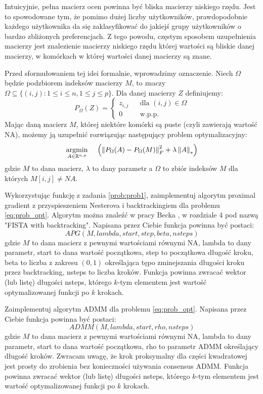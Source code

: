 \documentclass[10pt,a4paper,draft]{report}
\begin{document}
Intuicyjnie, pełna macierz ocen powinna być bliska macierzy niskiego rzędu. Jest to spowodowane tym, że pomimo dużej liczby użytkowników, prawdopodobnie każdego użytkownika da się zaklasyfikować do jakiejś grupy użytkowników o bardzo zbliżonych preferencjach. Z tego powodu, częstym sposobem uzupełnienia macierzy jest znalezienie macierzy niskiego rzędu której wartości są bliskie danej macierzy, w komórkach w której wartości danej macierzy są znane. 

Przed sformułowaniem tej idei formalnie, wprowadzimy oznaczenie. Niech $\Omega$ będzie podzbiorem indeksów macierzy $M$, to znaczy $\Omega \subseteq \{ (i,j): 1 \leq i \leq n, 1 \leq j \leq p\}$. Dla danej macierzy $Z$ definiujemy:
\[
P_{\Omega}(Z) = \left\{
\begin{array}{lcc}
z_{i,j} & & \text{dla } (i,j) \in \Omega \\
0 & & \text{w.p.p.}
\end{array}
\right.
\]
Mając daną macierz $M$, której niektóre komórki są puste (czyli zawierają wartość NA), możemy ją uzupełnić rozwiązując następujący problem optymalizacyjny:
\begin{equation} \label{eq:prob_opt}
\argminl\limits_{A \in \rset^{n,p}} \hspace{12pt} \left( \norm{P_{\Omega}(A) - P_{\Omega}(M)}_F^2 + \lambda \normNuc{A} \right) 
\end{equation}
gdzie $M$ to dana macierz, $\lambda$ to dany parametr a $\Omega$ to zbiór indeksów $M$ dla których $M[i,j] \neq NA$.


\begin{problem}
Wykorzystując funkcję z zadania \ref{prob:prob1}, zaimplementuj algorytm proximal gradient z przyspieszeniem Nesterova i backtrackingiem dla problemu \ref{eq:prob_opt}. Algorytm można znaleźć w pracy Becka \cite{beck} , w rozdziale 4 pod nazwą "FISTA with backtracking". Napisana przez Ciebie funkcja powinna być postaci:
\[
APG(M, lambda, start, step, beta, nsteps) 
\]
\noindent gdzie $M$ to dana macierz z pewnymi wartościami równymi NA, lambda to dany parametr, start to dana wartość początkowa, step to początkowa długość kroku, beta to liczba z zakresu $(0,1)$ określająca tępo zminejszania długości kroku przez backtracking, nsteps to liczba kroków. Funkcja powinna zwracać wektor (lub listę) długości nsteps, którego $k$-tym elementem jest wartość optymalizowanej funkcji po $k$ krokach.

\end{problem}
\newpage
\begin{problem}
Zaimplementuj algorytm ADMM dla problemu \ref{eq:prob_opt}. Napisana przez Ciebie funkcja powinna być postaci:
\[
ADMM(M, lambda, start, rho, nsteps)
\]
\noindent gdzie $M$ to dana macierz z pewnymi wartościami równymi NA, lambda to dany parametr, start to dana wartość początkowa, rho to parametr ADMM określający długość kroków. Zwracam uwagę, że krok proksymalny dla części kwadratowej jest prosty do zrobienia  bez konieczności używania consensus ADMM. Funkcja powinna zwracać wektor (lub listę) długości nsteps, którego $k$-tym elementem jest wartość optymalizowanej funkcji po $k$ krokach.

\end{problem}
\end{document}
